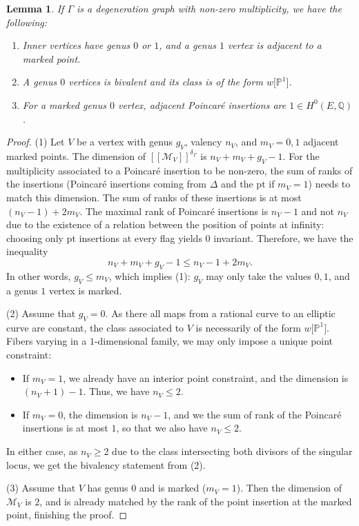 \documentclass[pdftex]{sigma}
\newcommand{\fvir}[2]{[\![ #1 ]\!]^{#2}}
\newcommand{\pt}{\mathrm{pt}}
\newcommand{\PP}{\mathbb{P}}
\newcommand{\QQ}{\mathbb{Q}}
\newcommand{\M}{\mathcal{M}}
\numberwithin{equation}{section}
\newtheorem{lem}[theo]{Lemma}
\theoremstyle{definition}
\begin{document}
\begin{lem}\label{lem-type-vertices}
 If $\Gamma$ is a degeneration graph with non-zero multiplicity, we have the following:
 \begin{enumerate}\itemsep=0pt
 \item[$(1)$] Inner vertices have genus $0$ or $1$, and a genus $1$ vertex is adjacent to a marked point.
 \item[$(2)$] A genus $0$ vertices is bivalent and its class is of the form $w\big[\PP^1\big]$.
 \item[$(3)$] For a marked genus $0$ vertex, adjacent Poincar\'e insertions are $1\in H^0(E,\QQ)$.
 \end{enumerate}
\end{lem}

\begin{proof}
 (1) Let $V$ be a vertex with genus $g_V$, valency $n_V$, and $m_V=0,1$ adjacent marked points. The dimension of $\fvir{\M_V}{\delta_\Gamma}$ is $n_V+m_V+g_V-1$. For the multiplicity associated to a Poincar\'e insertion to be non-zero, the sum of ranks of the insertions (Poincar\'e insertions coming from $\Delta$ and the $\pt$ if $m_V=1$) needs to match this dimension. The sum of ranks of these insertions is at most $(n_V-1)+2m_V$. The maximal rank of Poincar\'e insertions is $n_V-1$ and not $n_V$ due to the existence of a relation between the position of points at infinity: choosing only $\pt$ insertions at every flag yields $0$ invariant. Therefore, we have the inequality
 \[ n_V+m_V+g_V-1\leqslant n_V-1+2m_V. \]
 In other words, $g_V\leqslant m_V$, which implies (1): $g_V$ may only take the values $0,1$, and a genus $1$ vertex is marked.



 (2) Assume that $g_V=0$. As there all maps from a rational curve to an elliptic curve are constant, the class associated to $V$ is necessarily of the form $w\big[\PP^1\big]$. Fibers varying in a $1$-dimensional family, we may only impose a unique point constraint:
 \begin{itemize}\itemsep=0pt
 \item If $m_V=1$, we already have an interior point constraint, and the dimension is $(n_V+1)-1$. Thus, we have $n_V\leqslant 2$.
 \item If $m_V=0$, the dimension is $n_V-1$, and we the sum of rank of the Poincar\'e insertions is at most $1$, so that we also have $n_V\leqslant 2$.
 \end{itemize}
 In either case, as $n_V\geqslant 2$ due to the class intersecting both divisors of the singular locus, we get the bivalency statement from (2).



 (3) Assume that $V$ has genus $0$ and is marked ($m_V=1$). Then the dimension of $\M_V$ is $2$, and is already matched by the rank of the point insertion at the marked point, finishing the proof.
\end{proof}
\end{document}
